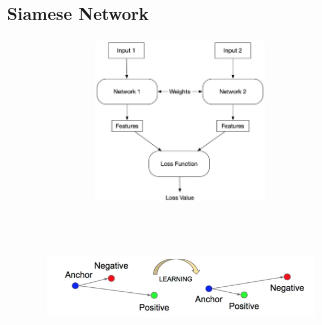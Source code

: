 \subsubsection{Siamese Network}
\begin{figure}
  \centering
  \begin{minipage}[t]{.45\textwidth}
    \centering
    \includegraphics[width=200pt,height=120pt]{pictures/siamese_network.png}
    \label{fig:siamese_network}
  \end{minipage}%
  \hspace{1cm}
  \begin{minipage}[t]{.45\textwidth}
    \centering
    \includegraphics[width=200pt,height=100pt]{pictures/triplet_loss.PNG}
    \label{fig:triplet_loss}
  \end{minipage}
\end{figure}
